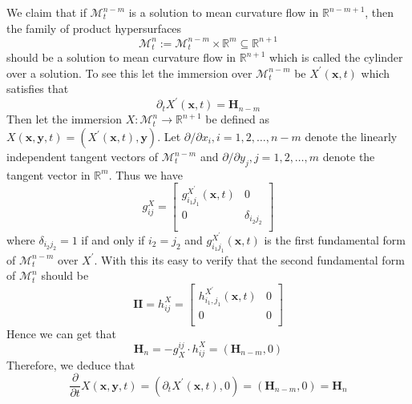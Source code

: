 We claim that if ${\mathcal{M}^{n-m}_t}$ is a solution to mean curvature flow in $\mathbb{R}^{n-m+1}$, then the family of product hypersurfaces
\begin{equation*}
    \mathcal{M}^n_t :=\mathcal{M}^{n-m}_t\times\mathbb{R}^m\subseteq\mathbb{R}^{n+1}
\end{equation*}
should be a solution to mean curvature flow in $\mathbb{R}^{n+1}$ which is called the cylinder over a solution. To see this let the immersion over $\mathcal{M}^{n-m}_t$ be $X^\prime(\boldsymbol{x},t)$ which satisfies that
\begin{equation*}
    \partial_t X^\prime(\boldsymbol{x},t)=\boldsymbol{H}_{n-m}
\end{equation*}
Then let the immersion $X:\mathcal{M}^n_t\to\mathbb{R}^{n+1}$ be defined as $X(\boldsymbol{x},\boldsymbol{y},t)=(X^\prime(\boldsymbol{x},t),\boldsymbol{y})$. Let $\partial/\partial x_i, i=1,2,\dots,n-m$ denote the linearly independent tangent vectors of $\mathcal{M}^{n-m}_t$ and $\partial/\partial y_j, j=1,2,\dots,m$ denote the tangent vector in $\mathbb{R}^m$. Thus we have
\begin{equation*}
    g^X_{ij}=\left[\begin{matrix}
        g^{X^\prime}_{i_1 j_1}(\boldsymbol{x},t)&    0\\
        0&    \delta_{i_2 j_2}\\
    \end{matrix}\right]
\end{equation*}
where $\delta_{i_2 j_2}=1$ if and only if $i_2=j_2$ and $g^{X^\prime}_{i_1 j_1}(\boldsymbol{x},t)$ is the first fundamental form of $\mathcal{M}^{n-m}_t$ over $X^\prime$. With this its easy to verify that the second fundamental form of $\mathcal{M}^n_t$ should be
\begin{equation*}
    \mathbf{II}=h^X_{ij}=\left[
        \begin{matrix}
            h^{X^\prime}_{i_1,j_1}(\boldsymbol{x},t)&    0\\
            0&   0\\
        \end{matrix}
    \right]
\end{equation*}
Hence we can get that
\begin{equation*}
    \boldsymbol{H}_{n}=-g^{ij}_X\cdot h^X_{ij}=\left(\boldsymbol{H}_{n-m},0\right)
\end{equation*}
Therefore, we deduce that
\begin{equation*}
    \frac{\partial}{\partial t}X(\boldsymbol{x},\boldsymbol{y},t)=\left(\partial_t X^\prime (\boldsymbol{x},t),0 \right)=(\boldsymbol{H}_{n-m},0)=\boldsymbol{H}_n
\end{equation*}


